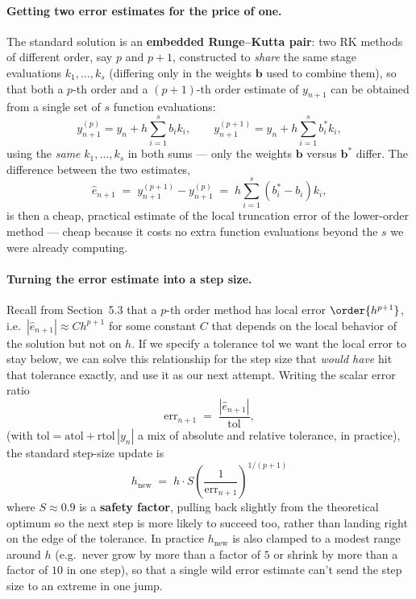 \paragraph{Getting two error estimates for the price of one.} The standard solution is an \textbf{embedded Runge--Kutta pair}: two RK methods of different order, say $p$ and $p+1$, constructed to \emph{share} the same stage evaluations $k_1,\dots,k_s$ (differing only in the weights $\mathbf b$ used to combine them), so that both a $p$-th order and a $(p{+}1)$-th order estimate of $y_{n+1}$ can be obtained from a single set of $s$ function evaluations:
\begin{equation}
y_{n+1}^{(p)} = y_n + h\sum_{i=1}^s b_i k_i, \qquad y_{n+1}^{(p+1)} = y_n + h\sum_{i=1}^s b_i^\ast k_i,
\end{equation}
using the \emph{same} $k_1,\dots,k_s$ in both sums --- only the weights $\mathbf b$ versus $\mathbf b^\ast$ differ. The difference between the two estimates,
\begin{equation}
\widehat{e}_{n+1} \;=\; y_{n+1}^{(p+1)} - y_{n+1}^{(p)} \;=\; h\sum_{i=1}^s \left(b_i^\ast - b_i\right) k_i,
\label{eq:embedded-error}
\end{equation}
is then a cheap, practical estimate of the local truncation error of the lower-order method --- cheap because it costs no extra function evaluations beyond the $s$ we were already computing.

\paragraph{Turning the error estimate into a step size.} Recall from Section~5.3 that a $p$-th order method has local error $\order{h^{p+1}}$, i.e.\ $|\widehat{e}_{n+1}| \approx C h^{p+1}$ for some constant $C$ that depends on the local behavior of the solution but not on $h$. If we specify a tolerance $\mathrm{tol}$ we want the local error to stay below, we can solve this relationship for the step size that \emph{would have} hit that tolerance exactly, and use it as our next attempt. Writing the scalar error ratio
\begin{equation}
\mathrm{err}_{n+1} \;=\; \frac{|\widehat{e}_{n+1}|}{\mathrm{tol}},
\end{equation}
(with $\mathrm{tol} = \mathrm{atol} + \mathrm{rtol}\,|y_n|$ a mix of absolute and relative tolerance, in practice), the standard step-size update is
\begin{equation}
\boxed{\, h_{\mathrm{new}} \;=\; h \cdot S \left(\frac{1}{\mathrm{err}_{n+1}}\right)^{1/(p+1)} \,}
\label{eq:step-control}
\end{equation}
where $S \approx 0.9$ is a \textbf{safety factor}, pulling back slightly from the theoretical optimum so the next step is more likely to succeed too, rather than landing right on the edge of the tolerance. In practice $h_{\mathrm{new}}$ is also clamped to a modest range around $h$ (e.g.\ never grow by more than a factor of $5$ or shrink by more than a factor of $10$ in one step), so that a single wild error estimate can't send the step size to an extreme in one jump.


